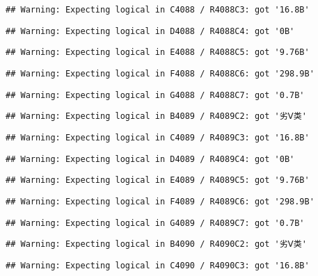 \documentclass[
]{article}
\begin{document}
\begin{verbatim}
## Warning: Expecting logical in C4088 / R4088C3: got '16.8B'
\end{verbatim}

\begin{verbatim}
## Warning: Expecting logical in D4088 / R4088C4: got '0B'
\end{verbatim}

\begin{verbatim}
## Warning: Expecting logical in E4088 / R4088C5: got '9.76B'
\end{verbatim}

\begin{verbatim}
## Warning: Expecting logical in F4088 / R4088C6: got '298.9B'
\end{verbatim}

\begin{verbatim}
## Warning: Expecting logical in G4088 / R4088C7: got '0.7B'
\end{verbatim}

\begin{verbatim}
## Warning: Expecting logical in B4089 / R4089C2: got '劣Ⅴ类'
\end{verbatim}

\begin{verbatim}
## Warning: Expecting logical in C4089 / R4089C3: got '16.8B'
\end{verbatim}

\begin{verbatim}
## Warning: Expecting logical in D4089 / R4089C4: got '0B'
\end{verbatim}

\begin{verbatim}
## Warning: Expecting logical in E4089 / R4089C5: got '9.76B'
\end{verbatim}

\begin{verbatim}
## Warning: Expecting logical in F4089 / R4089C6: got '298.9B'
\end{verbatim}

\begin{verbatim}
## Warning: Expecting logical in G4089 / R4089C7: got '0.7B'
\end{verbatim}

\begin{verbatim}
## Warning: Expecting logical in B4090 / R4090C2: got '劣Ⅴ类'
\end{verbatim}

\begin{verbatim}
## Warning: Expecting logical in C4090 / R4090C3: got '16.8B'
\end{verbatim}
\end{document}
